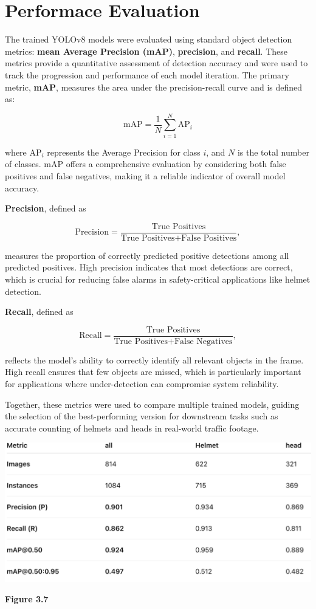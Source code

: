 \section{Performace Evaluation}

\noindent\hspace{2.5em}The trained YOLOv8 models were evaluated using standard object detection metrics: \textbf{mean Average Precision (mAP)}, \textbf{precision}, and \textbf{recall}. These metrics provide a quantitative assessment of detection accuracy and were used to track the progression and performance of each model iteration. The primary metric, \textbf{mAP}, measures the area under the precision-recall curve and is defined as:

\[
\text{mAP} = \frac{1}{N} \sum_{i=1}^{N} \text{AP}_i
\]

where $\text{AP}_i$ represents the Average Precision for class $i$, and $N$ is the total number of classes. mAP offers a comprehensive evaluation by considering both false positives and false negatives, making it a reliable indicator of overall model accuracy.

\textbf{Precision}, defined as

\[
\text{Precision} = \frac{\text{True Positives}}{\text{True Positives} + \text{False Positives}},
\]

measures the proportion of correctly predicted positive detections among all predicted positives. High precision indicates that most detections are correct, which is crucial for reducing false alarms in safety-critical applications like helmet detection.

\textbf{Recall}, defined as

\[
\text{Recall} = \frac{\text{True Positives}}{\text{True Positives} + \text{False Negatives}},
\]

reflects the model's ability to correctly identify all relevant objects in the frame. High recall ensures that few objects are missed, which is particularly important for applications where under-detection can compromise system reliability.

Together, these metrics were used to compare multiple trained models, guiding the selection of the best-performing version for downstream tasks such as accurate counting of helmets and heads in real-world traffic footage.

\begin{center}
	\includegraphics[width=1\textwidth]{performance.eva.png}
	
	\vspace{0.5em}
	\textbf{Figure 3.7}
\end{center}

